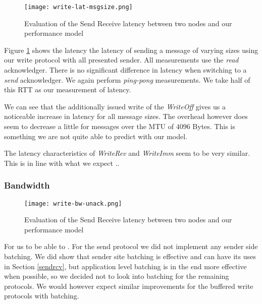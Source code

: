 \begin{figure}[h]
\texttt{[image: write-lat-msgsize.png]}
\caption{Evaluation of the Send Receive latency between two nodes and our performance model}
\label{fig:plot-write-lat}
\end{figure}

Figure \ref{fig:plot-write-lat} shows the latency the latency of sending a message of varying sizes using our write protocol
with all presented sender. All measurements use the \emph{read} acknowledger. There is no significant difference in latency
when switching to a \emph{send} acknowledger. 
We again perform \emph{ping-pong} measurements. We take half of this RTT as our measurement of latency.


We can see that the additionally issued write of the \emph{WriteOff} gives us a noticeable increase in latency for all message
sizes. The overhead however does seem to decrease a little for messages over the MTU of $4096$ Bytes. This is something we are
not quite able to predict with our model. 

The latency characteristics of \emph{WriteRev} and \emph{WriteImm} seem to be very similar. This is in line with what we expect
..

\subsubsection{Bandwidth}

\begin{figure}[h]
\texttt{[image: write-bw-unack.png]}
\caption{Evaluation of the Send Receive latency between two nodes and our performance model}
\label{fig:plot-write-bw-unack}
\end{figure}

For us to be able to . For the send protocol 
we did not implement any sender side batching. We did show that sender site batching is effective and can have its uses in 
Section \ref{sendrcv}, but application level batching is in the end more effective when possible, so we decided not to look 
into batching for the remaining protocols. We would however expect similar improvements for the buffered write 
protocols with batching.







